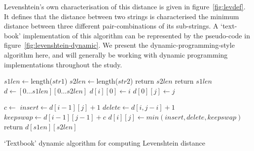 Levenshtein's own characterisation of this distance is given in
figure~\ref{fig:levdef}. It defines that the distance between two
strings is characterised the minimum distance between three different
pair-combinations of its sub-strings. A `text-book' implementation of
this algorithm can be represented by the pseudo-code in
figure~\ref{fig:levenshtein-dynamic}. We present the
dynamic-programming-style algorithm here, and will generally be
working with dynamic programming implementations throughout the study.


    
    

\begin{algorithm}
  \begin{algorithmic}[5]
    \State $s1len \gets $length($str1$)
    \State $s2len \gets $length($str2$)    
    \State return $s2len$
    \EndIf
    \State return $s1len$
    \EndIf
    \State $d \gets [0 \dots s1len][0 \dots s2len]$ 
    \State $d[i][0] \gets i$
    \EndFor
    \State $d[0][j] \gets j$
    \EndFor

    \State $c \gets $
    \State $insert \gets d[i-1][j] + 1$
    \State $delete \gets d[i,j-i] + 1$
    \State $keepswap \gets d[i-1][j-1] + c$
    \State $d[i][j] \gets min(insert, delete, keepswap)$
    \EndFor
    \EndFor
    \State return $d[s1en][s2len]$
    \EndFunction
  \end{algorithmic}
  \caption{`Textbook' dynamic algorithm for computing Levenshtein distance}
  \label{fig:levenshtein-dynamic}
\end{algorithm}


